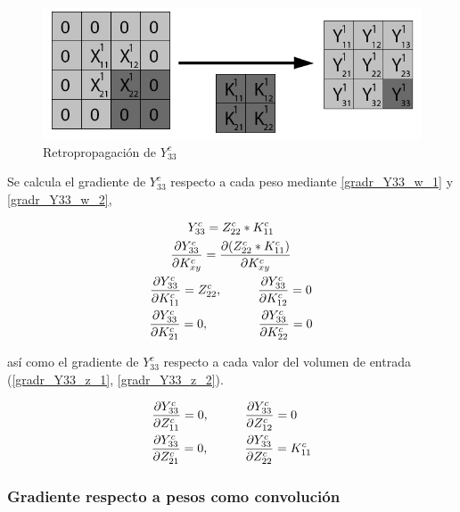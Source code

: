 \begin{figure}[H]
	\centering
	\includegraphics[width=0.8\linewidth]{imagenes/conv_back_padding_9.jpg} 
	\caption{Retropropagación de $Y^c_{33}$}
\end{figure}

Se calcula el gradiente de $Y^c_{33}$ respecto a cada peso mediante \ref{gradr_Y33_w_1} y \ref{gradr_Y33_w_2},


\begin{gather}
	Y^c_{33} = Z^c_{22} * K^c_{11} \\
	\frac{\partial Y^c_{33}}{\partial K^c_{xy}} = \frac{\partial (Z^c_{22} * K^c_{11})}{\partial K^c_{xy}} \\
	\frac{\partial Y^c_{33}}{\partial K^c_{11}} = Z^c_{22}, \hspace{10mm} \frac{\partial Y^c_{33}}{\partial K^c_{12}} = 0 \label{gradr_Y33_w_1} \\
	\frac{\partial Y^c_{33}}{\partial K^c_{21}} = 0, \hspace{14mm} \frac{\partial Y^c_{33}}{\partial K^c_{22}} = 0 \label{gradr_Y33_w_2}
\end{gather}

así como el gradiente de $Y^c_{33}$ respecto a cada valor del volumen de entrada (\ref{gradr_Y33_z_1}, \ref{gradr_Y33_z_2}).


\begin{gather}
	\frac{\partial Y^c_{33}}{\partial Z^c_{11}} = 0, \hspace{10mm} \frac{\partial Y^c_{33}}{\partial Z^c_{12}} = 0 \hspace{4mm} \label{gradr_Y33_z_1} \\
	\frac{\partial Y^c_{33}}{\partial Z^c_{21}} = 0, \hspace{10mm} \frac{\partial Y^c_{33}}{\partial Z^c_{22}} = K^c_{11} \label{gradr_Y33_z_2}
\end{gather}


\subsubsection{Gradiente respecto a pesos como convolución}

